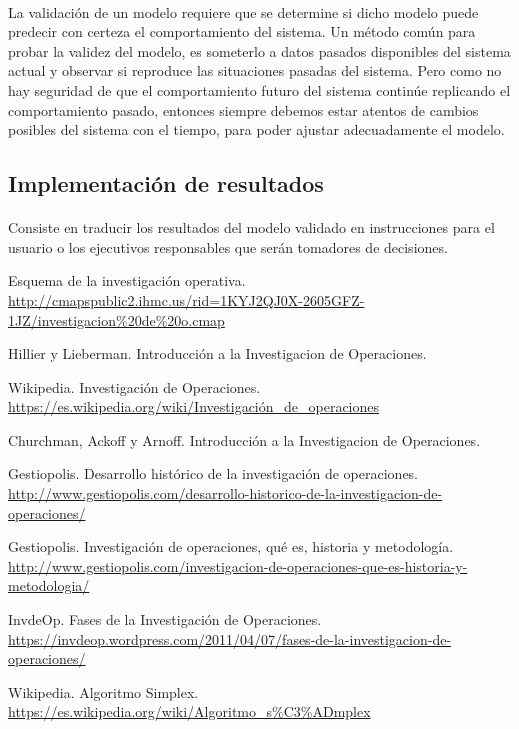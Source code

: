 \documentclass[12pt, a4paper,spanish]{article}
\begin{document}
			\paragraph{}
			La validación de un modelo requiere que se determine si dicho modelo puede predecir con certeza el comportamiento del sistema. Un método común para probar la validez del modelo, es someterlo a datos pasados disponibles del sistema actual y observar si reproduce las situaciones pasadas del sistema. Pero como no hay seguridad de que el comportamiento futuro del sistema continúe replicando el comportamiento pasado, entonces siempre debemos estar atentos de cambios posibles del sistema con el tiempo, para poder ajustar adecuadamente el modelo.\cite{invdeop_IO}

		\subsection{Implementación de resultados}

			\paragraph{}
			Consiste en traducir los resultados del modelo validado en instrucciones para el usuario o los ejecutivos responsables que serán tomadores de decisiones.\cite{invdeop_IO}


	\begin{thebibliography}{9}


		Esquema de la investigación operativa. \url{http://cmapspublic2.ihmc.us/rid=1KYJ2QJ0X-2605GFZ-1JZ/investigacion%20de%20o.cmap}

		Hillier y Lieberman. Introducción a la Investigacion de Operaciones.

		Wikipedia. Investigación de Operaciones. \url{https://es.wikipedia.org/wiki/Investigación_de_operaciones}

		Churchman, Ackoff y Arnoff. Introducción a la Investigacion de Operaciones.

		Gestiopolis. Desarrollo histórico de la investigación de operaciones. \url{http://www.gestiopolis.com/desarrollo-historico-de-la-investigacion-de-operaciones/}

		Gestiopolis. Investigación de operaciones, qué es, historia y metodología. \url{http://www.gestiopolis.com/investigacion-de-operaciones-que-es-historia-y-metodologia/}

		InvdeOp. Fases de la Investigación de Operaciones. \url{https://invdeop.wordpress.com/2011/04/07/fases-de-la-investigacion-de-operaciones/}

		Wikipedia. Algoritmo Simplex. \url{https://es.wikipedia.org/wiki/Algoritmo_s%C3%ADmplex}

	\end{thebibliography}
\end{document}
